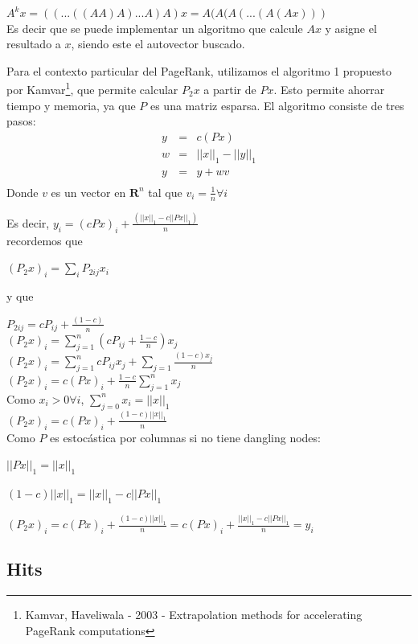 \documentclass[a4paper]{article}
\begin{document}
$A^kx=((...((AA)A)...A)A)x=A(A(A(...(A(Ax)))$\\
Es decir que se puede implementar un algoritmo que calcule $Ax$ y asigne el resultado a $x$, siendo este el autovector buscado.

Para el contexto particular del PageRank, utilizamos el algoritmo 1 propuesto por Kamvar\footnote{Kamvar, Haveliwala - 2003 - Extrapolation methods for accelerating PageRank computations}, que permite calcular $P_2 x$ a partir de $Px$. Esto permite ahorrar tiempo y memoria, ya que $P$ es una matriz esparsa. El algoritmo consiste de tres pasos:
\begin{eqnarray*}
y&=&c(Px)\\
w&=&||x||_1-||y||_1\\
y&=&y+wv\\
\end{eqnarray*}
Donde $v$ es un vector en $ \textbf{R}^n$ tal que $v_i=\frac{1}{n} \forall i$

Es decir, $y_i=(cPx)_i+\frac{(||x||_1-c||Px||_1)}n$\\

recordemos que

$(P_2x)_i=\sum_i P_{2ij} x_i$

y que

$P_{2ij}=cP_{ij}+\frac{(1-c)}n$\\

$(P_2x)_i=\sum_{j=1}^n (cP_{ij}+\frac{1-c}{n}) x_j$\\

$(P_2x)_i=\sum_{j=1}^n cP_{ij}x_j+\sum_{j=1}\frac{(1-c)x_j}{n}$\\

$(P_2x)_i=c(Px)_i+\frac{1-c}{n}\sum_{j=1}^nx_j$\\

Como $x_i>0\forall i$, $\sum_{j=0}^n x_i=||x||_1$\\

$(P_2x)_i=c(Px)_i+\frac{(1-c)||x||_1}n$\\

Como $P$ es estocástica por columnas si no tiene dangling nodes:

$||Px||_1=||x||_1$

$(1-c)||x||_1=||x||_1-c||Px||_1$

$(P_2x)_i=c(Px)_i+\frac{(1-c)||x||_1}n=c(Px)_i+\frac{||x||_1-c||Px||_1}n=y_i$


\subsection{Hits}
\end{document}
